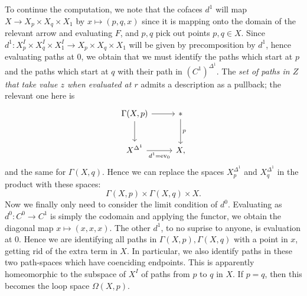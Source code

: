 To continue the computation, we note that the cofaces $d^1$ will map $X\to X_p\times X_q\times X_1$ by $x\mapsto (p,q,x)$ since it is mapping onto the domain of the relevant arrow and evaluating $F$, and $p,q$ pick out points $p,q\in X$. Since $d^1 : X_p^I \times X_q^I \times X_1^I \to X_p\times X_q\times X_1$ will be given by precomposition by $d^1$, hence evaluating paths at 0, we obtain that we must identify the paths which start at $p$ and the paths which start at $q$ with their path in $(C^1)^{\Delta^1} $. The \emph{set of paths in $Z$ that take value $z$ when evaluated at $r$} admits a description as a pullback; the relevant one here is
\[\begin{tikzcd}[row sep = 2.5em, column sep = 2.5em]
\Gamma(X,p)\ar[r] \ar[d]  & *\ar[" p ", d]  \\
X^{\Delta^1} \ar[" d^1=\mathrm{ev} _0 "', r]  & X,
\end{tikzcd}\]
and the same for $\Gamma(X,q)$. Hence we can replace the spaces $X^{\Delta^1}_p$ and $X^{\Delta^1} _q$ in the product with these spaces:
\[
	\Gamma(X,p)\times \Gamma(X,q)\times X
.\]
Now we finally only need to consider the limit condition of $d^0$. Evaluating as $d^0 : C^0 \to C^1$ is simply the codomain and applying the functor, we obtain the diagonal map $x\mapsto (x,x,x)$. The other $d^1$, to no suprise to anyone, is evaluation at $0$. Hence we are identifying all paths in $\Gamma(X,p),\Gamma(X,q)$ with a point in $x$, getting rid of the extra term in $X$. In particular, we also identify paths in these two path-spaces which have coenciding endpoints. This is apparently homeomorphic to the subspace of $X^{I} $ of paths from $p$ to $q$ in $X$. If $p=q$, then this becomes the loop space $\Omega(X,p)$.

